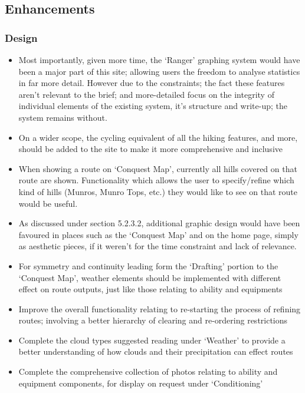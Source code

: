 \documentclass[11pt, english]{article}
\begin{document}
	\subsection{Enhancements}

		\subsubsection{Design}
	
	\begin{itemize}
	\setlength\itemsep{0cm}
		\item Most importantly, given more time, the `Ranger' graphing system would have been a major part of this site; allowing users the freedom to analyse statistics in far more detail. However due to the constraints; the fact these features aren't relevant to the brief; and more-detailed focus on the integrity of individual elements of the existing system, it's structure and write-up; the system remains without.\\
		\item On a wider scope, the cycling equivalent of all the hiking features, and more, should be added to the site to make it more comprehensive and inclusive
		\item When showing a route on `Conquest Map', currently all hills covered on that route are shown. Functionality which allows the user to specify/refine which kind of hills (Munros, Munro Tops, etc.) they would like to see on that route would be useful.
		\item As discussed under section 5.2.3.2, additional graphic design would have been favoured in places such as the `Conquest Map' and on the home page, simply as aesthetic pieces, if it weren't for the time constraint and lack of relevance.
		\item For symmetry and continuity leading form the `Drafting' portion to the `Conquest Map', weather elements should be implemented with different effect on route outputs, just like those relating to ability and equipments
		\item Improve the overall functionality relating to re-starting the process of refining routes; involving a better hierarchy of clearing and re-ordering restrictions
		\item Complete the cloud types suggested reading under `Weather' to provide a better understanding of how clouds and their precipitation can effect routes
		\item Complete the comprehensive collection of photos relating to ability and equipment components, for display on request under `Conditioning'
	\end{itemize}
	
\end{document}
